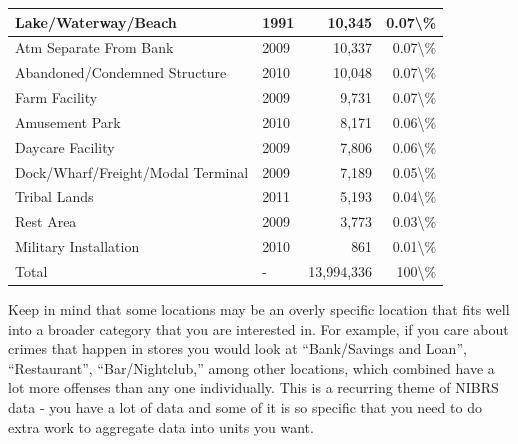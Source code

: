 \documentclass[
]{krantz}
\begin{document}
\begin{longtable}[t]{l|l|r|r}
\hline
Lake/Waterway/Beach & 1991 & 10,345 & 0.07\textbackslash{}\%\\
\hline
Atm Separate From Bank & 2009 & 10,337 & 0.07\textbackslash{}\%\\
\hline
Abandoned/Condemned Structure & 2010 & 10,048 & 0.07\textbackslash{}\%\\
\hline
Farm Facility & 2009 & 9,731 & 0.07\textbackslash{}\%\\
\hline
Amusement Park & 2010 & 8,171 & 0.06\textbackslash{}\%\\
\hline
Daycare Facility & 2009 & 7,806 & 0.06\textbackslash{}\%\\
\hline
Dock/Wharf/Freight/Modal Terminal & 2009 & 7,189 & 0.05\textbackslash{}\%\\
\hline
Tribal Lands & 2011 & 5,193 & 0.04\textbackslash{}\%\\
\hline
Rest Area & 2009 & 3,773 & 0.03\textbackslash{}\%\\
\hline
Military Installation & 2010 & 861 & 0.01\textbackslash{}\%\\
\hline
Total & - & 13,994,336 & 100\textbackslash{}\%\\
\hline
\end{longtable}

Keep in mind that some locations may be an overly specific
location that fits well into a broader category that you are
interested in. For example, if you care about crimes that
happen in stores you would look at ``Bank/Savings and
Loan'', ``Restaurant'', ``Bar/Nightclub,'' among other
locations, which combined have a lot more offenses than any
one individually. This is a recurring theme of NIBRS data -
you have a lot of data and some of it is so specific that
you need to do extra work to aggregate data into units you
want.
\end{document}
